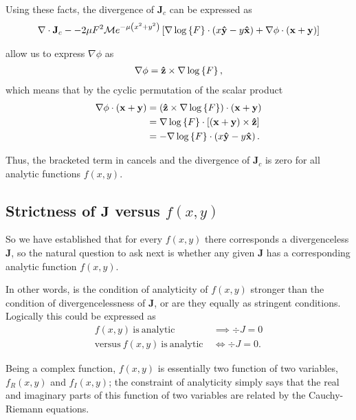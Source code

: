 Using these facts, the divergence of $\mathbf{J}_c$ can be expressed as
\begin{align}
    \nabla \cdot \mathbf{ J }_c - -2\mu F^2 \mathcal{M} e^{-\mu\left(x^2 + y^2\right)} \left[
        \nabla \log \left\{ F \right\} \cdot \left( x\mathbf{\hat y } - y\mathbf{\hat x } \right) + \nabla
        \phi \cdot \left( \mathbf{x} + \mathbf{y} \right) \right]
    \label{eqn:div-j}
\end{align}

 allow us to express $\nabla \phi$ as
\begin{align}
    \nabla \phi = \mathbf{\hat z } \times \nabla \log \left\{ F \right\},
\end{align}
which means that by the cyclic permutation of the scalar product
\begin{align}
    \nabla \phi \cdot \left( \mathbf{x} + \mathbf{y} \right)
    &= \left( \mathbf{\hat z } \times \nabla \log \left\{ F \right\} \right) \cdot \left( \mathbf{x} +
        \mathbf{y} \right) \\
    &= \nabla \log \left\{ F \right\} \cdot \left[ \left( \mathbf{x} + \mathbf{y} \right)
        \times \mathbf{\hat z } \right] \\
    &= - \nabla \log \left\{ F \right\} \cdot \left( x\mathbf{\hat y } - y\mathbf{\hat x } \right).
\end{align}

Thus, the bracketed term in  cancels and the divergence of
$\mathbf{J}_c$ is zero for all analytic functions $f(x,y)$.

\subsection{Strictness of $\mathbf{J}$ versus $f(x,y)$}

So we have established that for every $f(x,y)$ there corresponds a
divergenceless $\mathbf{J}$, so the natural question to ask next is whether any
given $\mathbf{J}$ has a corresponding analytic function $f(x,y)$.

In other words, is the condition of analyticity of $f(x,y)$ stronger than the
condition of divergencelessness of $\mathbf{J}$, or are they equally as
stringent conditions. Logically this could be expressed as
\begin{align}
    f(x,y) ~\mathrm{is~analytic}~ &\implies \div{J} = 0 \\
    \mathrm{versus}~ f(x,y) ~\mathrm{is~analytic}~ &\iff \div{J} = 0.
\end{align}

Being a complex function, $f(x,y)$ is essentially two function of two variables,
$f_R(x,y)$ and $f_I(x,y)$; the constraint of analyticity simply says that the
real and imaginary parts of this function of two variables are related by the
Cauchy-Riemann equations.

